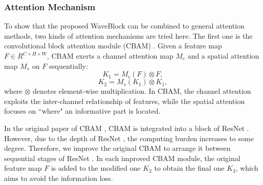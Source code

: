 \documentclass[journal]{IEEEtran}
\begin{document}
\subsubsection{Attention Mechanism}
To show that the proposed WaveBlock can be combined to general attention methods, two kinds of attention mechanisms are tried here. The first one is the convolutional block attention module (CBAM) \cite{woo2018cbam}. Given a feature map $F \in {R^{C \times H \times W}}$, CBAM exerts a channel attention map ${M_c} $ and a spatial attention map ${M_s}$ on $F$ sequentially:
\begin{equation}
{K_1} = {M_c}\left( F \right) \otimes F,
\end{equation}
\begin{equation}
{K_2} = {M_s}\left( {{K_1}} \right) \otimes {K_1},
\end{equation}
where $ \otimes $ denotes element-wise multiplication. In CBAM, the channel attention exploits the inter-channel relationship of features, while the spatial attention focuses on ``where" an informative part is located.  \par 
In the original paper of CBAM \cite{woo2018cbam}, CBAM is integrated into a block of ResNet \cite{he2016deep}. However, due to the depth of ResNet \cite{he2016deep}, the computing burden increases to some degree. Therefore, we improve the original CBAM to arrange it between sequential stages of ResNet \cite{he2016deep}. In each improved CBAM module, the original feature map $F$ is added to the modified one $K_2$ to obtain the final one $K_3$, which aims to avoid the information loss. \par 
\begin{comment}
The design of the original CBAM and the improved one are shown in Fig \ref{CBAM}. 
\begin{figure}[t] 
\centering    

\subfigure[Original CBAM] 
{	
	\begin{minipage}{8cm}
	\centering
	\texttt{[image: CBAM\_old.pdf]}  
	
	\end{minipage}
}
\subfigure[Improved CBAM] 
{
	\begin{minipage}{8cm}
	\centering
	\texttt{[image: CBAM\_new.pdf]}   
	\end{minipage}
}
\caption{The original CBAM and improved CBAM. The original CBAM is integrated with each block while the improved CBAM is arranged between sequential stages. When added CBAM into backbone, the improved CBAM has much less parameters than the original one.}
\label{CBAM}
\end{figure}
\end{comment}
\end{document}
